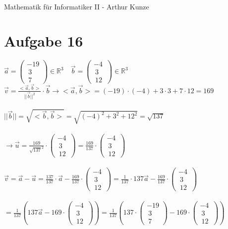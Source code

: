 \documentclass[12pt,a4paper]{article}
\begin{document}
Mathematik für Informatiker II - Arthur Kunze
\section*{Aufgabe 16}
$\vec{a} = \left( \begin{array}{c} -19 \\\ 3 \\\ 7 \ \end{array}\right)\in \mathbb{R}^3 \quad \vec{b} = \left( \begin{array}{c} -4 \\\ 3 \\\ 12 \ \end{array}\right)\in \mathbb{R}^3$\
\\
$\vec{v} = \frac{<\vec{a},\vec{b}>}{||\vec{b}||^2}\cdot \vec{b} \rightarrow <\vec{a},\vec{b}> = (-19)\cdot (-4)+3\cdot 3+7\cdot 12 = 169$\\
\\
$||\vec{b}|| =\sqrt{<\vec{b},\vec{b}>}=\sqrt{(-4)^2+3^2+12^2} = \sqrt{137}$\\
\\
$\rightarrow \vec{u}=\frac{169}{\sqrt{137}^2}\cdot \left( \begin{array}{c} -4 \\\ 3 \\\ 12 \ \end{array}\right)=\frac{169}{137}\cdot \left( \begin{array}{c} -4 \\\ 3 \\\ 12 \ \end{array}\right)$\\
\\
$\vec{v}= \vec{a}-\vec{u} = \frac{137}{137}\cdot \vec{a} - \frac{169}{137}\cdot \left( \begin{array}{c} -4 \\\ 3 \\\ 12 \ \end{array}\right)= \frac{1}{137}\cdot 137\vec{a} - \frac{169}{137}\cdot \left( \begin{array}{c} -4 \\\ 3 \\\ 12 \ \end{array}\right)$\\
\\
$=\frac{1}{137}(137\vec{a}-169\cdot \left( \begin{array}{c} -4 \\\ 3 \\\ 12 \ \end{array}\right))=\frac{1}{137}(137\cdot \left( \begin{array}{c} -19 \\\ 3 \\\ 7 \ \end{array}\right)-169\cdot \left( \begin{array}{c} -4 \\\ 3 \\\ 12 \ \end{array}\right))$\\
\end{document}
